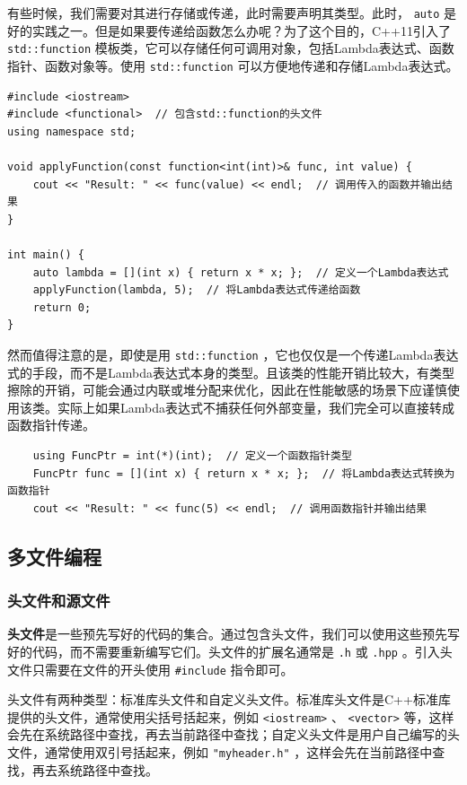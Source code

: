 有些时候，我们需要对其进行存储或传递，此时需要声明其类型。此时， \texttt{auto} 是好的实践之一。但是如果要传递给函数怎么办呢？为了这个目的，C++11引入了 \texttt{std::function} 模板类，它可以存储任何可调用对象，包括Lambda表达式、函数指针、函数对象等。使用 \texttt{std::function} 可以方便地传递和存储Lambda表达式。
\begin{verbatim}
#include <iostream>
#include <functional>  // 包含std::function的头文件
using namespace std;

void applyFunction(const function<int(int)>& func, int value) {
    cout << "Result: " << func(value) << endl;  // 调用传入的函数并输出结果
}

int main() {
    auto lambda = [](int x) { return x * x; };  // 定义一个Lambda表达式
    applyFunction(lambda, 5);  // 将Lambda表达式传递给函数
    return 0;
}
\end{verbatim}
然而值得注意的是，即使是用 \texttt{std::function} ，它也仅仅是一个传递Lambda表达式的手段，而不是Lambda表达式本身的类型。且该类的性能开销比较大，有类型擦除的开销，可能会通过内联或堆分配来优化，因此在性能敏感的场景下应谨慎使用该类。实际上如果Lambda表达式不捕获任何外部变量，我们完全可以直接转成函数指针传递。
\begin{verbatim}
    using FuncPtr = int(*)(int);  // 定义一个函数指针类型
    FuncPtr func = [](int x) { return x * x; };  // 将Lambda表达式转换为函数指针
    cout << "Result: " << func(5) << endl;  // 调用函数指针并输出结果
\end{verbatim}

\subsection{多文件编程}

\subsubsection{头文件和源文件}

\textbf{头文件}是一些预先写好的代码的集合。通过包含头文件，我们可以使用这些预先写好的代码，而不需要重新编写它们。头文件的扩展名通常是 \texttt{.h} 或 \texttt{.hpp} 。引入头文件只需要在文件的开头使用 \texttt{\#include} 指令即可。

头文件有两种类型：标准库头文件和自定义头文件。标准库头文件是C++标准库提供的头文件，通常使用尖括号括起来，例如 \texttt{<iostream>} 、 \texttt{<vector>} 等，这样会先在系统路径中查找，再去当前路径中查找；自定义头文件是用户自己编写的头文件，通常使用双引号括起来，例如 \texttt{"myheader.h"} ，这样会先在当前路径中查找，再去系统路径中查找。

